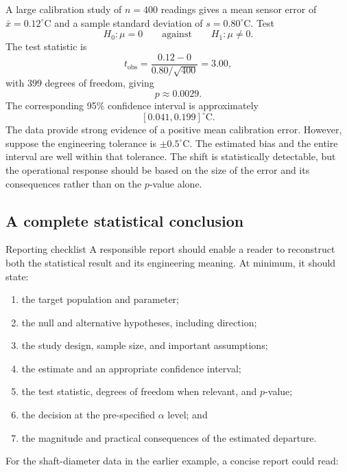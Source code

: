 \begin{example}\par
A large calibration study of $n=400$ readings gives a mean sensor error of $\bar x=0.12^\circ$C and a sample standard deviation of $s=0.80^\circ$C. Test
\[
H_0:\mu=0
\qquad\text{against}\qquad
H_1:\mu\neq0.
\]
The test statistic is
\[
t_{\mathrm{obs}}
=\frac{0.12-0}{0.80/\sqrt{400}}
=3.00,
\]
with $399$ degrees of freedom, giving
\[
p\approx0.0029.
\]
The corresponding 95\% confidence interval is approximately
\[
[0.041,0.199]^\circ\text{C}.
\]
The data provide strong evidence of a positive mean calibration error. However, suppose the engineering tolerance is $\pm0.5^\circ$C. The estimated bias and the entire interval are well within that tolerance. The shift is statistically detectable, but the operational response should be based on the size of the error and its consequences rather than on the $p$-value alone.
\end{example}

\subsection{A complete statistical conclusion}

\begin{custombox}{Reporting checklist}
A responsible report should enable a reader to reconstruct both the statistical result and its engineering meaning. At minimum, it should state:

\begin{enumerate}
  \item the target population and parameter;
  \item the null and alternative hypotheses, including direction;
  \item the study design, sample size, and important assumptions;
  \item the estimate and an appropriate confidence interval;
  \item the test statistic, degrees of freedom when relevant, and $p$-value;
  \item the decision at the pre-specified $\alpha$ level; and
  \item the magnitude and practical consequences of the estimated departure.
\end{enumerate}
\end{custombox}

For the shaft-diameter data in the earlier example, a concise report could read:

